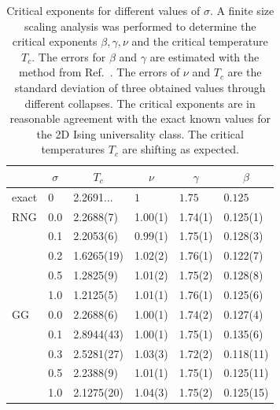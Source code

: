 \documentclass[pre,twocolumn,groupedaddress,showpacs,showkeys,amsmath,amssymb,floatfix]{revtex4-1}
\begin{document}
        \begin{table}[htb]
            \begin{ruledtabular}
                \begin{tabular}{l l l l l l}
                     & \multicolumn{1}{c}{\(\sigma\)} & \multicolumn{1}{c}{\(T_c\)} & \multicolumn{1}{c}{\(\nu\)} & \multicolumn{1}{c}{\(\gamma\)} & \multicolumn{1}{c}{\(\beta\)}\\
                    \hline
                    exact        & 0   & 2.2691... & \(1\)    & \(1.75\) & \(0.125\)\\
                    \hline
                    RNG          & 0.0 & 2.2688(7) & 1.00(1) & 1.74(1) & 0.125(1) \\
                                 & 0.1 & 2.2053(6) & 0.99(1) & 1.75(1) & 0.128(3) \\
                                 & 0.2 & 1.6265(19)& 1.02(2) & 1.76(1) & 0.122(7) \\
                                 & 0.5 & 1.2825(9) & 1.01(2) & 1.75(2) & 0.128(8) \\
                                 & 1.0 & 1.2125(5) & 1.01(1) & 1.76(1) & 0.125(6) \\
                    \hline
                    GG           & 0.0 & 2.2688(6) & 1.00(1) & 1.74(2) & 0.127(4) \\
                                 & 0.1 & 2.8944(43)& 1.00(1) & 1.75(1) & 0.135(6) \\
                                 & 0.3 & 2.5281(27)& 1.03(3) & 1.72(2) & 0.118(11)\\
                                 & 0.5 & 2.2388(9) & 1.01(1) & 1.75(1) & 0.125(11)\\
                                 & 1.0 & 2.1275(20)& 1.04(3) & 1.75(2) & 0.125(15)\\
                \end{tabular}
            \end{ruledtabular}
            \caption[Critical Exponents for Different $\sigma$]{
                Critical exponents for different values of \(\sigma\). A finite size
                scaling analysis was performed to determine the critical
                exponents \(\beta, \gamma, \nu\) and the critical temperature
                \(T_c\). The errors for \(\beta\) and \(\gamma\) are estimated
                with the method from Ref.~\cite{autoscale2009}. The errors of
                \(\nu\) and \(T_c\) are the standard deviation of three obtained
                values through different collapses. The critical exponents
                are in reasonable agreement with the exact known values for the 2D Ising
                universality class. The critical temperatures $T_c$ are shifting
                as expected.
            }
            \label{tab:critExp}
        \end{table}
\end{document}
